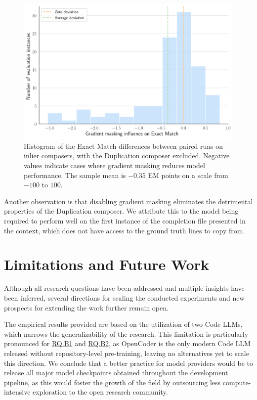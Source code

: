 \begin{figure}[ht]
    \centering
    \includegraphics[width=\textwidth]{figures/gradient-masking.pdf}
    \caption{Histogram of the Exact Match differences between paired runs on inlier composers, with the Duplication composer excluded. Negative values indicate cases where gradient masking reduces model performance. The sample mean is \(-0.35\) EM points on a scale from \(-100\) to \(100\).}\label{fig:gradient-masking}
\end{figure}

Another observation is that disabling gradient masking eliminates the detrimental properties of the Duplication composer. We attribute this to the model being required to perform well on the first instance of the completion file presented in the context, which does not have access to the ground truth lines to copy from.

\section{Limitations and Future Work}

Although all research questions have been addressed and multiple insights have been inferred, several directions for scaling the conducted experiments and new prospects for extending the work further remain open.

The empirical results provided are based on the utilization of two Code LLMs, which narrows the generalizability of the research. This limitation is particularly pronounced for \hyperref[rq:rq-b1]{RQ.B1} and \hyperref[rq:rq-b2]{RQ.B2}, as OpenCoder is the only modern Code LLM released without repository-level pre-training, leaving no alternatives yet to scale this direction. We conclude that a better practice for model providers would be to release all major model checkpoints obtained throughout the development pipeline, as this would foster the growth of the field by outsourcing less compute-intensive exploration to the open research community.

